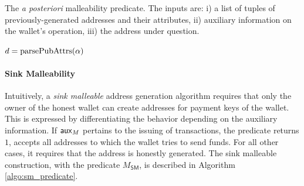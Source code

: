 \begin{algorithm}
    \caption{The \emph{a posteriori} malleability predicate. The inputs are: i) a list of tuples of previously-generated addresses and their attributes, ii) auxiliary information on the wallet's operation, iii) the address under question.}\label{algo:pm_predicate}
    \begin{algorithmic}
                    \State {}
                \EndCase
                    \State $d = \textrm{parsePubAttrs}(\alpha)$
                            \State {}
                        \EndIf
                            \State {}
                        \EndIf
                    \EndFor
                    \State {}
                \EndCase
            \EndSwitch
        \EndFunction
    \end{algorithmic}
\end{algorithm}

\paragraph{Sink Malleability}
Intuitively, a \emph{sink malleable} address generation algorithm requires that
only the owner of the honest wallet can create addresses for payment keys of
the wallet. This is expressed by differentiating the behavior depending on the
auxiliary information. If $\mathsf{aux}_M$ pertains to the issuing of transactions, the
predicate returns $1$, \ie accepts all addresses to which the wallet tries to
send funds. For all other cases, it requires that the address is honestly
generated. The sink malleable construction, with the predicate
$M_{\mathsf{SM}}$, is described in Algorithm \ref{algo:sm_predicate}.

